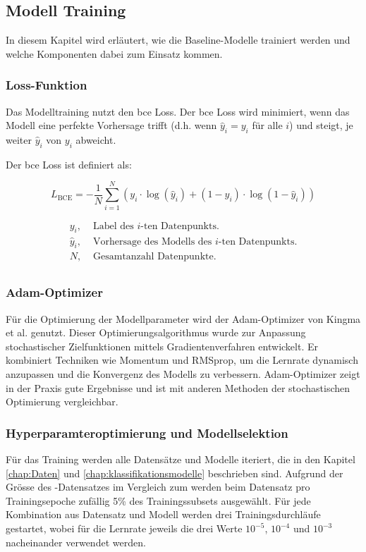 \subsection{Modell Training} \label{chap:modelltraining}
In diesem Kapitel wird erläutert, wie die Baseline-Modelle trainiert werden und welche Komponenten dabei zum Einsatz kommen.

\subsubsection{Loss-Funktion} \label{chap:loss-function}
Das Modelltraining nutzt den \acrfull{bce} Loss. Der \acrshort{bce} Loss wird minimiert, wenn das Modell eine perfekte Vorhersage trifft (d.h. wenn $\hat{y}_i = y_i$ für alle $i$) und steigt, je weiter $\hat{y}_i$ von $y_i$ abweicht.

Der \acrshort{bce} Loss ist definiert als:

\begin{equation}
    L_{\text{BCE}} = -\frac{1}{N} \sum_{i=1}^{N} (y_i \cdot \log(\hat{y}_i) + (1-y_i) \cdot \log(1-\hat{y}_i))
    \label{eq:TrainingBCE}
\end{equation}

\begin{align*}
    y_i,        &\text{ Label des $i$-ten Datenpunkts.} \\
    \hat{y}_i,  &\text{ Vorhersage des Modells des $i$-ten Datenpunkts.} \\
    N,          &\text{ Gesamtanzahl Datenpunkte.} \\
\end{align*} 

\subsubsection{Adam-Optimizer} \label{chap:optimizer}
Für die Optimierung der Modellparameter wird der Adam-Optimizer von Kingma et al. \cite{kingma_adam_2017} genutzt. Dieser Optimierungsalgorithmus wurde zur Anpassung stochastischer Zielfunktionen mittels Gradientenverfahren entwickelt. Er kombiniert Techniken wie Momentum und RMSprop, um die Lernrate dynamisch anzupassen und die Konvergenz des Modells zu verbessern. Adam-Optimizer zeigt in der Praxis gute Ergebnisse und ist mit anderen Methoden der stochastischen Optimierung vergleichbar.

\subsubsection{Hyperparamteroptimierung und Modellselektion}
Für das Training werden alle Datensätze und Modelle iteriert, die in den Kapitel \ref{chap:Daten} und \ref{chap:klassifikationsmodelle} beschrieben sind. Aufgrund der Grösse des -Datensatzes im Vergleich zum  werden beim  Datensatz pro Trainingsepoche zufällig 5\% des Trainingssubsets ausgewählt. Für jede Kombination aus Datensatz und Modell werden drei Trainingsdurchläufe gestartet, wobei für die Lernrate jeweils die drei Werte $10^{-5}$, $10^{-4}$ und $10^{-3}$ nacheinander verwendet werden.

